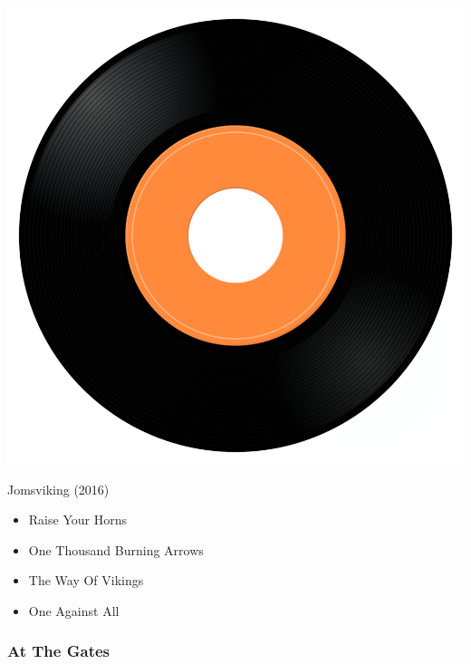 \begin{minipage}[t]{0.25\textwidth}\vspace{0pt}
\captionsetup{type=figure}
\includegraphics[width=\textwidth]{Images/cover.png}
\caption*{Jomsviking (2016)}
\end{minipage}
\begin{minipage}[t]{0.25\textwidth}\vspace{0pt}
\begin{itemize}[nosep,leftmargin=1em,labelwidth=*,align=left]
	\setlength{\itemsep}{0pt}
	\item Raise Your Horns
	\item One Thousand Burning Arrows
	\item The Way Of Vikings
	\item One Against All
\end{itemize}
\end{minipage}

\subsubsection{At The Gates}


